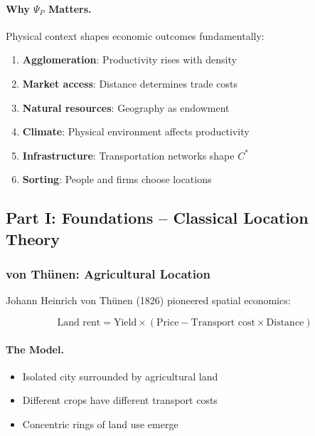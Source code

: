 \paragraph{Why $\Psi_P$ Matters.}
Physical context shapes economic outcomes fundamentally:
\begin{enumerate}
    \item \textbf{Agglomeration}: Productivity rises with density
    \item \textbf{Market access}: Distance determines trade costs
    \item \textbf{Natural resources}: Geography as endowment
    \item \textbf{Climate}: Physical environment affects productivity
    \item \textbf{Infrastructure}: Transportation networks shape $C^*$
    \item \textbf{Sorting}: People and firms choose locations
\end{enumerate}

\subsection{Part I: Foundations – Classical Location Theory}

\subsubsection{von Thünen: Agricultural Location}

Johann Heinrich von Thünen (1826) pioneered spatial economics:

\begin{equation}
\boxed{
\text{Land rent} = \text{Yield} \times (\text{Price} - \text{Transport cost} \times \text{Distance})
}
\label{eq:thunen}
\end{equation}

\paragraph{The Model.}
\begin{itemize}
    \item Isolated city surrounded by agricultural land
    \item Different crops have different transport costs
    \item Concentric rings of land use emerge
\end{itemize}

